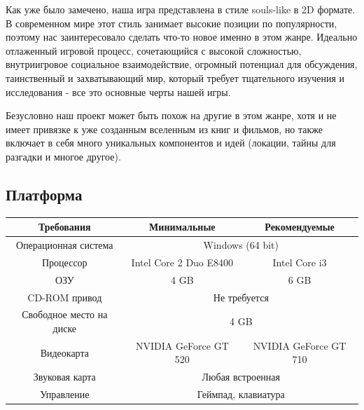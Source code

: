 \documentclass{article}
\begin{document}
Как уже было замечено, наша игра представлена в стиле souls-like в 2D формате. В современном мире этот стиль занимает высокие позиции по популярности, поэтому нас заинтересовало сделать что-то новое именно в этом жанре. Идеально отлаженный игровой процесс, сочетающийся с высокой сложностью, внутриигровое социальное взаимодействие, огромный потенциал для обсуждения, таинственный и захватывающий мир, который требует тщательного изучения и исследования - все это основные черты нашей игры. 

Безусловно наш проект может быть похож на другие в этом жанре, хотя и не имеет привязке к уже созданным вселенным из книг и фильмов, но также включает в себя много уникальных компонентов и идей (локации, тайны для разгадки и многое другое). 

\subsection{Платформа}

\begin{tabular}{|c|cc|}
\hline

Требования               & \multicolumn{1}{c|}{Минимальные}            &
Рекомендуемые         \\ \hline
Операционная система     & \multicolumn{2}{c|}{Windows (64 bit)}                               \\ \hline
Процессор                & \multicolumn{1}{c|}{Intel Core 2 Duo E8400} & Intel Core i3         \\ \hline
ОЗУ                      & \multicolumn{1}{c|}{4 GB}                   & 6 GB                  \\ \hline
CD-ROM привод            & \multicolumn{2}{c|}{Не требуется}                                   \\ \hline
Свободное место на диске & \multicolumn{2}{c|}{4 GB}                                           \\ \hline
Видеокарта               & \multicolumn{1}{c|}{NVIDIA GeForce GT 520}  & NVIDIA GeForce GT 710 \\ \hline
Звуковая карта           & \multicolumn{2}{c|}{Любая встроенная}                               \\ \hline
Управление               & \multicolumn{2}{c|}{Геймпад, клавиатура}                            \\ \hline
\end{tabular}
\\[10mm]
\end{document}
